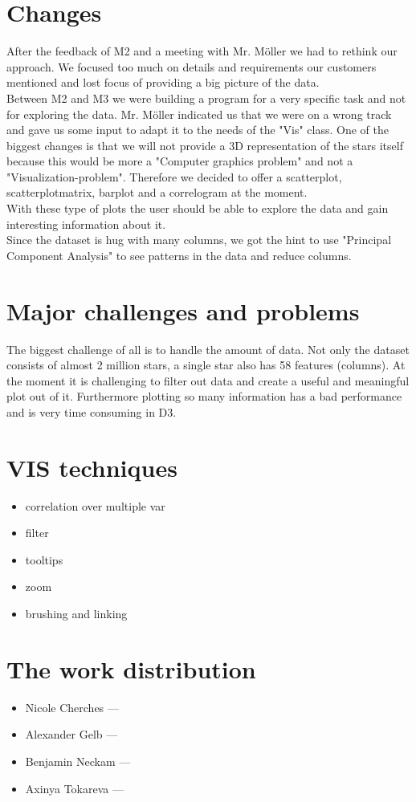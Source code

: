 \documentclass{article}
\begin{document}
\section{Changes}
After the feedback of M2 and a meeting with Mr. Möller we had to rethink our approach. We focused too much on details and requirements our customers mentioned and lost focus of providing a big picture of the data.\\
Between M2 and M3 we were building a program for a very specific task and not for exploring the data. Mr. Möller indicated us that we were on a wrong track and gave us some input to adapt it to the needs of the "Vis" class. One of the biggest changes is that we will not provide a 3D representation of the stars itself because this would be more a "Computer graphics problem" and not a "Visualization-problem". Therefore we decided to offer a scatterplot, scatterplotmatrix, barplot and a correlogram at the moment.\\
With these type of plots the user should be able to explore the data and gain interesting information about it.\\
Since the dataset is hug with many columns, we got the hint to use "Principal Component Analysis" to see patterns in the data and reduce columns.
\section{Major challenges and problems}
The biggest challenge of all is to handle the amount of data. Not only the dataset consists of almost 2 million stars, a single star also has 58 features (columns). At the moment it is challenging to filter out data and create a useful and meaningful plot out of it.  Furthermore plotting so many information has a bad performance and is very time consuming in D3.

\section {VIS techniques}
\begin{itemize}
\item correlation over multiple var
\item filter
\item tooltips
\item zoom
\item brushing and linking
\end{itemize}

\section {The work distribution}
\begin{itemize}
\item Nicole Cherches —
\item Alexander Gelb —
\item Benjamin Neckam —
\item Axinya Tokareva — 
\end{itemize}
\end{document}
